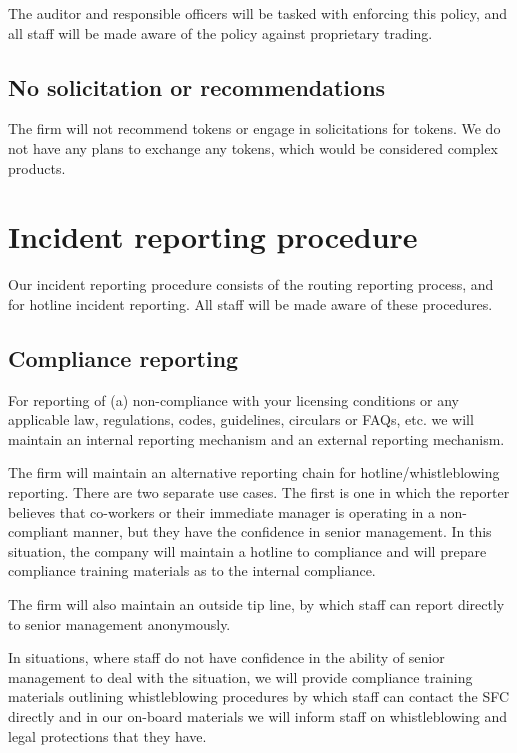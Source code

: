 The auditor and responsible officers will be tasked with enforcing
this policy, and all staff will be made aware of the policy against
proprietary trading.

\subsection{No solicitation or recommendations}
The firm will not recommend tokens or engage in solicitations for
tokens.  We do not have any plans to exchange any tokens, which would
be considered complex products.

\section{Incident reporting procedure}

Our incident reporting procedure consists of the routing reporting
process, and for hotline incident reporting.  All staff will be
made aware of these procedures.

\subsection{Compliance reporting}

For reporting of (a) non-compliance with your licensing conditions or
any applicable law, regulations, codes, guidelines, circulars or
FAQs, etc. we will maintain an internal reporting mechanism and an
external reporting mechanism.

The firm will maintain an alternative reporting chain for
hotline/whistleblowing reporting.  There are two separate use cases.
The first is one in which the reporter believes that co-workers or
their immediate manager is operating in a non-compliant manner, but
they have the confidence in senior management.  In this situation, the
company will maintain a hotline to compliance and will prepare
compliance training materials as to the internal compliance.

The firm will also maintain an outside tip line, by which staff can
report directly to senior management anonymously.

In situations, where staff do not have confidence in the ability of
senior management to deal with the situation, we will provide
compliance training materials outlining whistleblowing procedures by
which staff can contact the SFC directly and in our on-board materials
we will inform staff on whistleblowing and legal protections that
they have.

